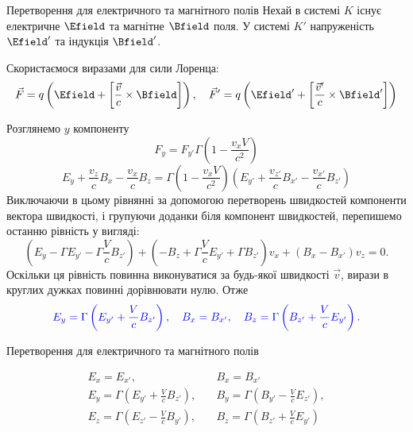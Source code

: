 \documentclass[9pt]{beamer}
\let\vect\vec
\begin{document}
\begin{frame}{Перетворення для електричного та магнітного полів}{}
	Нехай в системі $ K $ існує електричне $ \Efield $ та магнітне $ \Bfield $ поля. У системі $ K' $ напруженість $ \Efield' $ та індукція $ \Bfield' $.

	\bigskip

	\begin{overprint}
		\small
		Скористаємося виразами для сили Лоренца:
		\begin{equation*}
			\vect{F} = q\left( \Efield + \left[ \frac{\vect{v}}{c}\times\Bfield\right] \right) , \quad
			\vect{F}' = q\left( \Efield' + \left[ \frac{\vect{v}'}{c}\times\Bfield'\right] \right)
		\end{equation*}

		Розглянемо $ y $ компоненту
		\begin{equation*}
			F_y = F_{y'}\Gamma\left( 1 - \frac{v_xV}{c^2}\right)
		\end{equation*}
		\begin{equation*}
			E_y + \frac{v_z}{c}B_x - \frac{v_x}{c}B_z = \Gamma\left( 1 - \frac{v_xV}{c^2}\right) \left( E_{y'} + \frac{v_{z'}}{c}B_{x'} - \frac{v_{x'}}{c}B_{z'} \right)
		\end{equation*}
		Виключаючи в цьому рівнянні за допомогою перетворень швидкостей компоненти вектора швидкості, і групуючи доданки біля компонент швидкостей, перепишемо останню рівність у вигляді:
		\begin{equation*}
			\left( E_y  - \Gamma E_{y'} -\Gamma\frac{V}{c}B_{z'}\right) +
			\left( - B_z +\Gamma\frac{V}{c}E_{y'} +\Gamma B_{z'}\right)v_x +
			\left( B_x - B_{x'}\right)v_z = 0.
		\end{equation*}
		Оскільки ця рівність повинна виконуватися за будь-якої швидкості $ \vect{v} $, вирази в круглих дужках повинні дорівнювати нулю. Отже
		\begin{equation*}\color{blue}
			E_y = \Gamma\left( E_{y'} + \frac{V}{c}B_{z'}\right), \quad B_x = B_{x'}, \quad  B_z = \Gamma\left(B_{z'} + \frac{V}{c}E_{y'} \right).
		\end{equation*}
		\onslide<2>
		\vspace*{5em}
		\begin{center}
			Перетворення для електричного та магнітного полів
		\end{center}
		\begin{tcolorbox}[sharp corners, colframe=blue!50!black, colback=white,  top=0pt]
			{ \color{blue}
				\begin{align*}
					E_x = E_{x'},                                         & \quad B_x = B_{x'} \\
					E_y = \Gamma\left( E_{y'} + \frac{V}{c}B_{z'}\right), & \quad
					B_y = \Gamma\left( B_{y'} - \frac{V}{c}E_{z'}\right) ,                     \\
					E_z = \Gamma\left( E_{z'} - \frac{V}{c}B_{y'}\right), & \quad
					B_z = \Gamma\left( B_{z'} + \frac{V}{c}E_{y'}\right)
				\end{align*}
			}
		\end{tcolorbox}


\end{overprint}
\end{frame}
\end{document}
